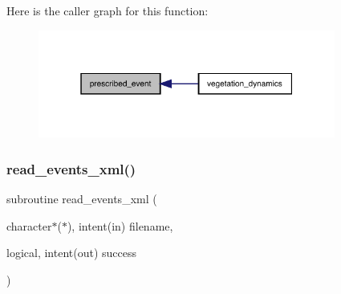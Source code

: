 Here is the caller graph for this function\+:
\nopagebreak
\begin{figure}[H]
\begin{center}
\leavevmode
\includegraphics[width=277pt]{events_8f90_ad9f17e2da07d80a0734f81d8b2e27d25_icgraph}
\end{center}
\end{figure}
\mbox{\label{events_8f90_a88f99ba09eb95b65d497f6bd8bddaa65}} 
\subsubsection{\texorpdfstring{read\+\_\+events\+\_\+xml()}{read\_events\_xml()}}
{\footnotesize\ttfamily subroutine read\+\_\+events\+\_\+xml (\begin{DoxyParamCaption}\item[{character$\ast$($\ast$), intent(in)}]{filename,  }\item[{logical, intent(out)}]{success }\end{DoxyParamCaption})}

